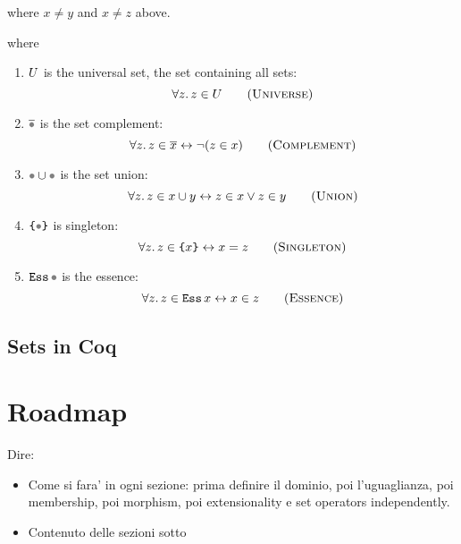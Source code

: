 \documentclass[sigplan,10pt,anonymous,review]{acmart}\settopmatter{printfolios=true,printccs=false,printacmref=false}
\begin{document}
where $x\neq y$ and $x \neq z$ above.

where
\begin{enumerate} \renewcommand\labelitemi{--}
  \item $U$ is the universal set, \ie{} the set containing all sets:
    \[ \forall z.\, z \in \Universe \sctag{Universe} \]
  \item $\Complement \Placeholder$ is the set complement:
    \[ \forall z.\, z \in \Complement x \leftrightarrow \neg (z \in x) \sctag{Complement}\]
  \item $\Union \Placeholder \Placeholder$ is the set union:
    \[ \forall z.\, z \in \Union x y \leftrightarrow z \in x \lor z \in y \sctag{Union} \]
  \item $\Sing\Placeholder$ is singleton:
    \[ \forall z.\, z \in \Sing x \leftrightarrow x = z \sctag{Singleton} \]
  \item $\Essence\Placeholder$ is the essence:
    \[ \forall z.\, z \in \Essence{x} \leftrightarrow x \in z \sctag{Essence} \]
\end{enumerate}

\subsection{Sets in Coq}


\section{Roadmap}
Dire:
\begin{itemize}
  \item Come si fara' in ogni sezione: prima definire il dominio, poi l'uguaglianza, poi membership, poi morphism, poi extensionality e set operators independently.
  \item Contenuto delle sezioni sotto
\end{itemize}

\section{\ZF}


\section{\NFTWO}

\end{document}
